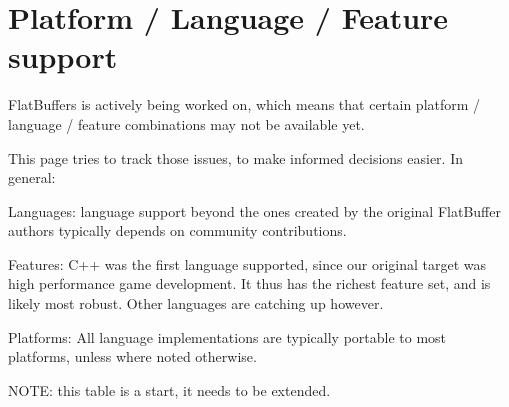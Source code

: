 \chapter{Platform / Language / Feature support}
\hypertarget{flatbuffers_support}{}\label{flatbuffers_support}
Flat\+Buffers is actively being worked on, which means that certain platform / language / feature combinations may not be available yet.

This page tries to track those issues, to make informed decisions easier. In general\+:


\begin{DoxyItemize}
\item Languages\+: language support beyond the ones created by the original Flat\+Buffer authors typically depends on community contributions.
\item Features\+: C++ was the first language supported, since our original target was high performance game development. It thus has the richest feature set, and is likely most robust. Other languages are catching up however.
\item Platforms\+: All language implementations are typically portable to most platforms, unless where noted otherwise.
\end{DoxyItemize}

NOTE\+: this table is a start, it needs to be extended.

